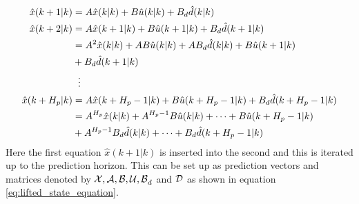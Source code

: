 
\begin{equation}\label{eq:iterating_state_equation}
\begin{aligned}
	\hat{x}(k+1|k) &= A\hat{x}(k|k)+B\hat{u}(k|k) + B_d\hat{d}(k|k)\\
	\hat{x}(k+2|k) &= A\hat{x}(k+1|k)+B\hat{u}(k+1|k)+ B_d\hat{d}(k+1|k) \\
				   &= A^2\hat{x}(k|k)+AB\hat{u}(k|k)+AB_d\hat{d}(k|k) + B\hat{u}(k+1|k) \\
				   &+ B_d\hat{d}(k+1|k) \\
				   &\hspace{2mm}\vdots\\
   \hat{x}(k+H_p|k)&= A\hat{x}(k+H_p-1|k)+B\hat{u}(k+H_p-1|k)+B_d\hat{d}(k+H_p-1|k)\\
   				   &= A^{H_p}\hat{x}(k|k)+A^{H_p-1}B\hat{u}(k|k)+\cdots+ B\hat{u}(k+H_p-1|k)\\
   				   &+A^{H_p-1}B_d\hat{d}(k|k)+\cdots+B_d\hat{d}(k+H_p-1|k)
\end{aligned}
\end{equation}
Here the first equation $\hat{x}(k+1|k)$ is inserted into the second and this is iterated up to the prediction horizon. This can be set up as prediction vectors and matrices denoted by $\CMcal{X,A,B,U,B}_d$ and $\CMcal{D}$ as shown in equation \ref{eq:lifted_state_equation}.




